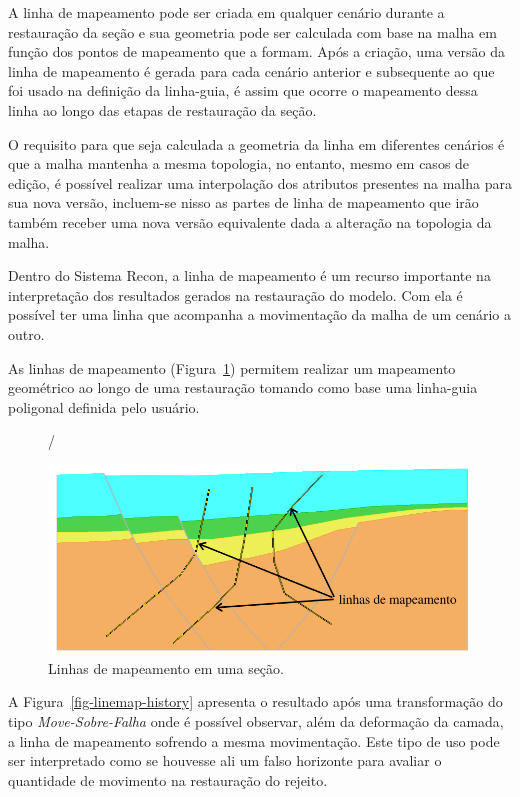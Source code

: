 A linha de mapeamento pode ser criada em qualquer cenário durante a restauração da seção e sua geometria pode ser calculada com base na malha em função dos pontos de mapeamento que a formam. Após a criação, uma versão da linha de mapeamento é gerada para cada cenário anterior e subsequente ao que foi usado na definição da linha-guia, é assim que 
ocorre o mapeamento dessa linha ao longo das etapas de restauração da seção.

O requisito para que seja calculada a geometria da linha em diferentes cenários é que a malha mantenha a mesma topologia, no entanto, mesmo em casos de edição, é possível realizar uma interpolação dos atributos presentes na malha para sua nova versão, incluem-se nisso as partes de linha de mapeamento que irão também receber uma nova versão equivalente dada a alteração na topologia da malha.

Dentro do Sistema Recon, a linha de mapeamento é um recurso importante na interpretação dos resultados gerados na restauração do modelo. Com ela é possível ter uma linha que acompanha a movimentação da malha de um cenário a outro.

As linhas de mapeamento (Figura~\ref{fig-linemap}) permitem realizar um mapeamento geométrico ao longo de uma restauração tomando como base uma linha-guia poligonal definida pelo usuário.

\begin{figure} [h]
  /\begin{center}
    \includegraphics[width=400pt]{images/fig-linhas-de-mapeamento-ed}
    \caption{Linhas de mapeamento em uma seção.}\label{fig-linemap}
  \end{center}
\end{figure}

A Figura~\ref{fig-linemap-history} apresenta o resultado após uma transformação do tipo \textit{Move-Sobre-Falha} onde é possível observar, além da deformação da camada, a linha de mapeamento sofrendo a mesma movimentação. Este tipo de uso pode ser interpretado como se houvesse ali um falso horizonte para avaliar o quantidade de movimento na restauração do rejeito.

